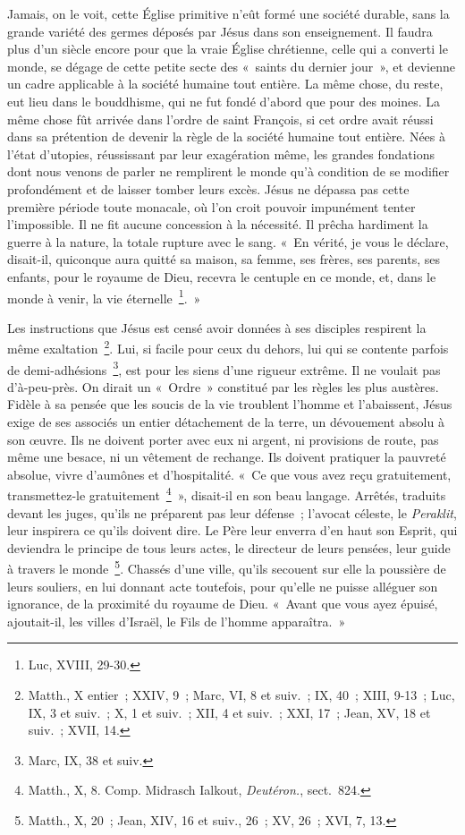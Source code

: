 \documentclass[french,twoside]{book} %
\begin{document}
Jamais, on le voit, cette Église primitive n’eût formé une société durable, sans la grande variété des germes déposés par Jésus dans son enseignement. Il faudra plus d’un siècle encore pour que la vraie Église chrétienne, celle qui a converti le monde, se dégage de cette petite secte des « saints du dernier jour », et devienne un cadre applicable à la société humaine tout entière. La même chose, du reste, eut lieu dans le bouddhisme, qui ne fut fondé d’abord que pour des moines. La même chose fût arrivée dans l’ordre de saint François, si cet ordre avait réussi dans sa prétention de devenir la règle de la société humaine tout entière. Nées à l’état d’utopies, réussissant par leur exagération même, les grandes fondations dont nous venons de parler ne remplirent le monde qu’à condition de se modifier profondément et de laisser tomber leurs excès. Jésus ne dépassa pas cette première période toute monacale, où l’on croit pouvoir impunément tenter l’impossible. Il ne fit aucune concession à la nécessité. Il prêcha hardiment la guerre à la nature, la totale rupture avec le sang. « En vérité, je vous le déclare, disait-il, quiconque aura quitté sa maison, sa femme, ses frères, ses parents, ses enfants, pour le royaume de Dieu, recevra le centuple en ce monde, et, dans le monde à venir, la vie éternelle \footnote{Luc, XVIII, 29-30.}. »\par
Les instructions que Jésus est censé avoir données à ses disciples respirent la même exaltation \footnote{Matth., X entier ; XXIV, 9 ; Marc, VI, 8 et suiv. ; IX, 40 ; XIII, 9-13 ; Luc, IX, 3 et suiv. ; X, 1 et suiv. ; XII, 4 et suiv. ; XXI, 17 ; Jean, XV, 18 et suiv. ; XVII, 14.}. Lui, si facile pour ceux du dehors, lui qui se contente parfois de demi-adhésions \footnote{Marc, IX, 38 et suiv.}, est pour les siens d’une rigueur extrême. Il ne voulait pas d’à-peu-près. On dirait un « Ordre » constitué par les règles les plus austères. Fidèle à sa pensée que les soucis de la vie troublent l’homme et l’abaissent, Jésus exige de ses associés un entier détachement de la terre, un dévouement absolu à son œuvre. Ils ne doivent porter avec eux ni argent, ni provisions de route, pas même une besace, ni un vêtement de rechange. Ils doivent pratiquer la pauvreté absolue, vivre d’aumônes et d’hospitalité. « Ce que vous avez reçu gratuitement, transmettez-le gratuitement \footnote{ Matth., X, 8. Comp. Midrasch Ialkout, {\itshape Deutéron.}, sect. 824.} », disait-il en son beau langage. Arrêtés, traduits devant les juges, qu’ils ne préparent pas leur défense ; l’avocat céleste, le {\itshape Peraklit}, leur inspirera ce qu’ils doivent dire. Le Père leur enverra d’en haut son Esprit, qui deviendra le principe de tous leurs actes, le directeur de leurs pensées, leur guide à travers le monde \footnote{Matth., X, 20 ; Jean, XIV, 16 et suiv., 26 ; XV, 26 ; XVI, 7, 13.}. Chassés d’une ville, qu’ils secouent sur elle la poussière de leurs souliers, en lui donnant acte toutefois, pour qu’elle ne puisse alléguer son ignorance, de la proximité du royaume de Dieu. « Avant que vous ayez épuisé, ajoutait-il, les villes d’Israël, le Fils de l’homme apparaîtra. »\par
\end{document}
